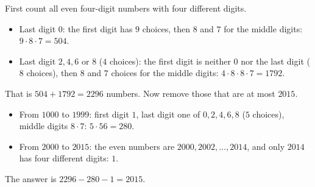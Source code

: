 First count all even four-digit numbers with four different digits.
\begin{itemize}
\item Last digit $0$: the first digit has $9$ choices, then $8$ and $7$ for the middle digits: $9\cdot8\cdot7=504$.
\item Last digit $2,4,6$ or $8$ ($4$ choices): the first digit is neither $0$ nor the last digit ($8$ choices), then $8$ and $7$ choices for the middle digits: $4\cdot8\cdot8\cdot7=1792$.
\end{itemize}
That is $504+1792=2296$ numbers. Now remove those that are at most $2015$.
\begin{itemize}
\item From $1000$ to $1999$: first digit $1$, last digit one of $0,2,4,6,8$ ($5$ choices), middle digits $8\cdot7$: $5\cdot56=280$.
\item From $2000$ to $2015$: the even numbers are $2000,2002,\dots,2014$, and only $2014$ has four different digits: $1$.
\end{itemize}
The answer is $2296-280-1=\boxed{2015}$.
